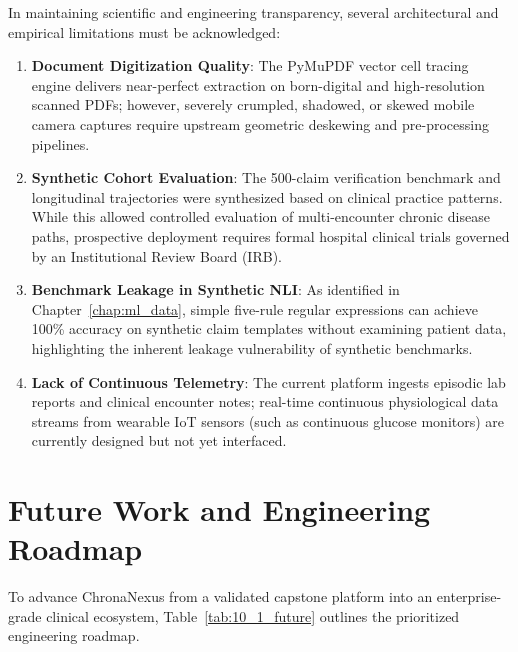 In maintaining scientific and engineering transparency, several architectural and empirical limitations must be acknowledged:
\begin{enumerate}
    \item \textbf{Document Digitization Quality}: The PyMuPDF vector cell tracing engine delivers near-perfect extraction on born-digital and high-resolution scanned PDFs; however, severely crumpled, shadowed, or skewed mobile camera captures require upstream geometric deskewing and pre-processing pipelines.
    \item \textbf{Synthetic Cohort Evaluation}: The 500-claim verification benchmark and longitudinal trajectories were synthesized based on clinical practice patterns. While this allowed controlled evaluation of multi-encounter chronic disease paths, prospective deployment requires formal hospital clinical trials governed by an Institutional Review Board (IRB).
    \item \textbf{Benchmark Leakage in Synthetic NLI}: As identified in Chapter~\ref{chap:ml_data}, simple five-rule regular expressions can achieve 100\% accuracy on synthetic claim templates without examining patient data, highlighting the inherent leakage vulnerability of synthetic benchmarks.
    \item \textbf{Lack of Continuous Telemetry}: The current platform ingests episodic lab reports and clinical encounter notes; real-time continuous physiological data streams from wearable IoT sensors (such as continuous glucose monitors) are currently designed but not yet interfaced.
\end{enumerate}


\section{Future Work and Engineering Roadmap}
\label{sec:future_work}

To advance ChronaNexus from a validated capstone platform into an enterprise-grade clinical ecosystem, Table~\ref{tab:10_1_future} outlines the prioritized engineering roadmap.


